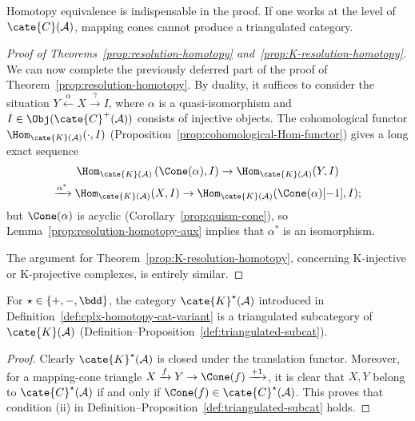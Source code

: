 Homotopy equivalence is indispensable in the proof. If one works at the
level of $\cate{C}(\mathcal{A})$, mapping cones cannot produce a triangulated
category.

\begin{proof}[Proof of Theorems~\ref{prop:resolution-homotopy} and~\ref{prop:K-resolution-homotopy}]
	We can now complete the previously deferred part of the proof of
	Theorem~\ref{prop:resolution-homotopy}. By duality, it suffices to
	consider the situation
	$Y \xleftarrow{\alpha} X \xrightarrow{\gamma} I$, where $\alpha$ is a
	quasi-isomorphism and
	$I \in \Obj(\cate{C}^+(\mathcal{A}))$ consists of injective objects. The
	cohomological functor
	$\Hom_{\cate{K}(\mathcal{A})}(\cdot, I)$
	(Proposition~\ref{prop:cohomological-Hom-functor}) gives a long exact
	sequence
	\begin{multline*}
		\Hom_{\cate{K}(\mathcal{A})}\left( \Cone(\alpha), I \right)  \to \Hom_{\cate{K}(\mathcal{A})}(Y, I) \\
		\xrightarrow{\alpha^*} \Hom_{\cate{K}(\mathcal{A})}(X, I) \to \Hom_{\cate{K}(\mathcal{A})}(\Cone(\alpha)[-1], I);
	\end{multline*}
	but $\Cone(\alpha)$ is acyclic
	(Corollary~\ref{prop:quism-cone}), so
	Lemma~\ref{prop:resolution-homotopy-aux} implies that $\alpha^*$ is an
	isomorphism.

	The argument for Theorem~\ref{prop:K-resolution-homotopy}, concerning
	K-injective or K-projective complexes, is entirely similar.
\end{proof}

\begin{corollary}
	For $\star \in \{+, -, \bdd\}$, the category
	$\cate{K}^\star(\mathcal{A})$ introduced in
	Definition~\ref{def:cplx-homotopy-cat-variant} is a triangulated
	subcategory of $\cate{K}(\mathcal{A})$
	(Definition--Proposition~\ref{def:triangulated-subcat}).
\end{corollary}

\begin{proof}
	Clearly $\cate{K}^\star(\mathcal{A})$ is closed under the translation
	functor. Moreover, for a mapping-cone triangle
	$X \xrightarrow{f} Y \to \Cone(f) \xrightarrow{+1}$, it is clear that
	$X,Y$ belong to $\cate{C}^\star(\mathcal{A})$ if and only if
	$\Cone(f) \in \cate{C}^\star(\mathcal{A})$. This proves that condition
	(ii) in Definition--Proposition~\ref{def:triangulated-subcat} holds.
\end{proof}

